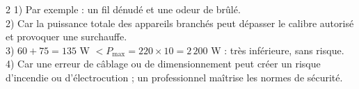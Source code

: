\begin{multicols}{2}
1) Par exemple : un fil dénudé et une odeur de brûlé.\\
2) Car la puissance totale des appareils branchés peut dépasser le calibre autorisé et
provoquer une surchauffe.\\
3) $60+75=135$ W $<P_{\max}=220\times10=2\,200$ W : très inférieure, sans risque.\\
4) Car une erreur de câblage ou de dimensionnement peut créer un risque d'incendie ou
d'électrocution ; un professionnel maîtrise les normes de sécurité.

\end{multicols}
\exercicesBanner
